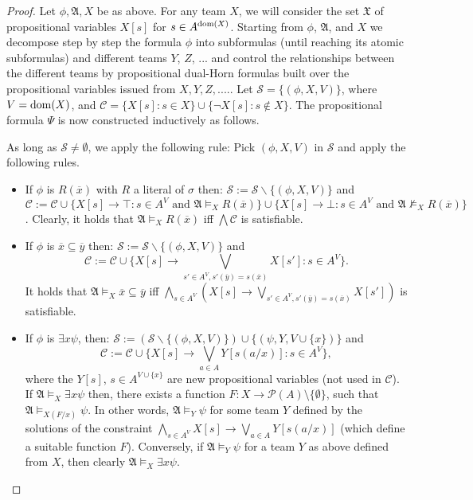 \documentclass{article}
\theoremstyle{plain}
\theoremstyle{definition}
\newcommand{\sg}{\sigma}
\newcommand{\mA}{{\mathfrak A}}
\newcommand{\dom}{{\rm dom}}
\newcommand{\restrict}[2]{{#1}({#2})}
\newcommand{\calC}{{\mathcal C}}
\newcommand{\calS}{{\mathcal S}}
\newcommand{\mX}{{\mathfrak X}}
\newcommand{\tu}[1]{\overline{#1}}
\begin{document}
  \begin{proof}
Let $\phi, \mA, X$ be as above. For any team $X$, we  will consider the set $\mX$ of propositional variables $X[s]$ for $s\in A^{\dom(X)}$.
Starting from $\phi$, $\mA$, and $X$ we decompose step by step the formula $\phi$ into subformulas (until reaching its atomic subformulas) and different teams $Y$, $Z$, ... and control the relationships between the different teams by propositional dual-Horn formulas built over the propositional variables issued from $X,Y,Z,...$..
Let $\calS=\{(\phi,X,V)\}$, where $V=\dom(X)$, and $\calC=\{X[s] : s\in X\} \cup \{\neg X[s] : s\not\in X\}$. The propositional formula $\Psi$ is now constructed inductively as follows.
  
  As long as $\calS\neq \emptyset$, we apply the following rule:  Pick $(\phi,X,V)$ in $\calS$ and apply the following rules.
  
  \begin{itemize}
  	\item If $\phi$ is  $R(\tu x)$ with $R$ a literal of $\sg$ then: $\calS:=\calS\backslash \{(\phi,X,V)\}$  and 
  	$\calC:=\calC \cup \{X[s]\rightarrow \top : s \in A^V\mbox{ and } \mA\models_X R(\tu x) \}\cup \{X[s]\rightarrow \bot : s \in A^V\mbox{ and } \mA\not\models_X R(\tu x) \}$.
Clearly, it holds that $\mA\models_XR(\tu x)$ iff $ \bigwedge\calC$ is satisfiable.
  	
  	
  	\item If $\phi$ is  $\tu x \subseteq \tu y$ then: $\calS:= \calS\backslash \{(\phi,X,V)\}$  and  
  	\[\textstyle
\calC:=\calC \cup \{X[s]\rightarrow \bigvee_{s'\in A^V, \restrict{s'}{\tu y}=\restrict{s}{\tu x}} X[s']:
  	 s\in A^V \}. \]
It holds that $\mA\models_X\tu x \subseteq \tu y$ iff $ \bigwedge_{s\in A^V} (X[s]\rightarrow \bigvee_{s'\in A^V, \restrict{s'}{\tu y}=\restrict{s}{\tu x}} X[s'])$ is satisfiable.
  	  	
  	
  	\item If $\phi$ is  $\exists x \psi$, then: $\calS := ( \calS \backslash \{(\phi,X,V)\} ) \cup \{(\psi,Y, V\cup\{x\})\}$ and 
  	\[
  		\textstyle
\calC:=\calC \cup \{X[s]\rightarrow \bigvee_{
  	  	  	a\in A} Y[s(a/x)]: s\in A^V \}, 
  	  	\]
\noindent where the $Y[s]$, $s\in A^{V\cup\{x\}}$ are new  propositional variables (not used in $\calC$).
If $\mA\models_X\exists x \psi$ then, there exists a function $F\colon X\rightarrow \mathcal{P}(A)\setminus \{\emptyset\}$, such that $\mA\models_{X(F/x)} \psi$. In other words,  $\mA\models_Y\psi$ for some team $Y$ defined by the solutions  of the constraint $\bigwedge_{s\in A^V} X[s]\rightarrow \bigvee_{a\in A} Y[s(a/x)]$ (which define a suitable function $F$). Conversely, if $\mA\models_Y\psi$ for a team $Y$ as above defined from $X$, then clearly $\mA\models_X\exists x \psi$.


\end{itemize}
\end{proof}
\end{document}
